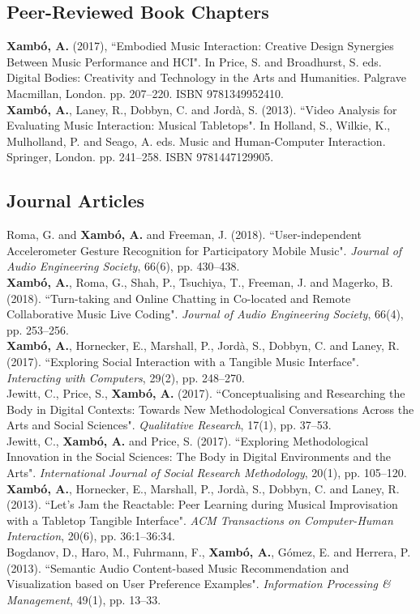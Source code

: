 \documentclass[10pt, a4paper]{article}
\newcommand{\years}[1]{\marginnote{\scriptsize #1}}
\begin{document}
\subsection*{Peer-Reviewed Book Chapters}
\noindent
\years{2016}\textbf{Xambó, A.} (2017), “Embodied Music Interaction: Creative Design Synergies Between Music Performance and HCI". In Price, S. and Broadhurst, S. eds. Digital Bodies: Creativity and Technology in the Arts and Humanities. Palgrave Macmillan, London. pp. 207--220. ISBN 9781349952410.\\
\years{2013}\textbf{Xambó, A.}, Laney, R., Dobbyn, C. and Jordà, S. (2013). “Video Analysis for Evaluating Music Interaction: Musical Tabletops". In Holland, S., Wilkie, K., Mulholland, P. and Seago, A. eds. Music and Human-Computer Interaction. Springer, London. pp. 241--258. ISBN 9781447129905.

\subsection*{Journal Articles}
\noindent
\years{2018b}Roma, G. and \textbf{Xambó, A.} and Freeman, J. (2018). “User-independent Accelerometer Gesture Recognition for Participatory Mobile Music". \emph{Journal of Audio Engineering Society}, 66(6), pp. 430--438.\\
\years{2018a}\textbf{Xambó, A.}, Roma, G., Shah, P., Tsuchiya, T., Freeman, J. and Magerko, B. (2018). “Turn-taking and Online Chatting in Co-located and Remote Collaborative Music Live Coding". \emph{Journal of Audio Engineering Society}, 66(4), pp. 253--256.\\
\years{2017c}\textbf{Xambó, A.}, Hornecker, E., Marshall, P., Jordà, S., Dobbyn, C. and Laney, R. (2017). “Exploring Social Interaction with a Tangible Music Interface". \emph{Interacting with Computers}, 29(2), pp. 248--270.\\
\years{2017b}Jewitt, C., Price, S., \textbf{Xambó, A.} (2017). “Conceptualising and Researching the Body in Digital Contexts: Towards New Methodological Conversations Across the Arts and Social Sciences". \emph{Qualitative Research}, 17(1), pp. 37--53.\\
\years{2017a}Jewitt, C., \textbf{Xambó, A.} and Price, S. (2017). “Exploring Methodological Innovation in the Social Sciences: The Body in Digital Environments and the Arts". \emph{International Journal of Social Research Methodology},  20(1), pp. 105--120.\\
\years{2013b}\textbf{Xambó, A.}, Hornecker, E., Marshall, P., Jordà, S., Dobbyn, C. and Laney, R. (2013). “Let's Jam the Reactable: Peer Learning during Musical Improvisation with a Tabletop Tangible Interface". \emph{ACM Transactions on Computer-Human Interaction}, 20(6), pp. 36:1--36:34.\\
\years{2013a}Bogdanov, D., Haro, M., Fuhrmann, F., \textbf{Xambó, A.}, Gómez, E. and Herrera, P. (2013). “Semantic Audio Content-based Music Recommendation and Visualization based on User Preference Examples". \emph{Information Processing \& Management}, 49(1), pp. 13--33.
\end{document}
